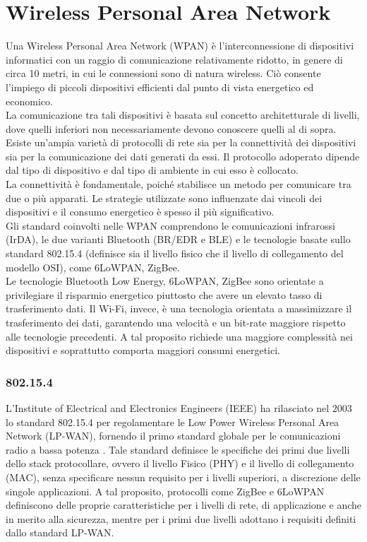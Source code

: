 \section{Wireless Personal Area Network}
Una Wireless Personal Area Network (WPAN) è l'interconnessione di dispositivi informatici con un raggio di comunicazione relativamente ridotto, in genere di circa 10 metri, in cui le connessioni sono di natura wireless. Ciò consente l'impiego di piccoli dispositivi efficienti dal punto di vista energetico ed economico.\\
La comunicazione tra tali dispositivi è basata sul concetto architetturale di livelli, dove quelli inferiori non necessariamente devono conoscere quelli al di sopra. Esiste un'ampia varietà di protocolli di rete sia per la connettività dei dispositivi sia per la comunicazione dei dati generati da essi. Il protocollo adoperato dipende dal tipo di dispositivo e dal tipo di ambiente in cui esso è collocato.\\
La connettività è fondamentale, poiché stabilisce un metodo per comunicare tra due o più apparati. Le strategie utilizzate sono influenzate dai vincoli dei dispositivi e il consumo energetico è spesso il più significativo.\\

\noindent Gli standard coinvolti nelle WPAN comprendono le comunicazioni infrarossi (IrDA), le due varianti Bluetooth (BR/EDR e BLE) e le tecnologie basate sullo standard 802.15.4 (definisce sia il livello fisico che il livello di collegamento del modello OSI), come 6LoWPAN, ZigBee.\\
Le tecnologie Bluetooth Low Energy, 6LoWPAN, ZigBee sono orientate a privilegiare il risparmio energetico piuttosto che avere un elevato tasso di trasferimento dati. Il Wi-Fi, invece, è una tecnologia orientata a massimizzare il trasferimento dei dati, garantendo una velocità e un bit-rate maggiore rispetto alle tecnologie precedenti. A tal proposito richiede una maggiore complessità nei dispositivi e soprattutto comporta maggiori consumi energetici.

\subsubsection{802.15.4}
L'Institute of Electrical and Electronics Engineers (IEEE) ha rilasciato nel 2003 lo standard 802.15.4 per regolamentare le Low Power Wireless Personal Area Network (LP-WAN), fornendo il primo standard globale per le comunicazioni radio a bassa potenza  \cite{callaway2002home}.
Tale standard definisce le specifiche dei primi due livelli dello stack protocollare, ovvero il livello Fisico (PHY) e il livello di collegamento (MAC), senza specificare nessun requisito per i livelli superiori, a discrezione delle singole applicazioni.
A tal proposito, protocolli come ZigBee e 6LoWPAN definiscono delle proprie caratteristiche per i livelli di rete, di applicazione e anche in merito alla sicurezza, mentre per i primi due livelli adottano i requisiti definiti dallo standard LP-WAN.\\

